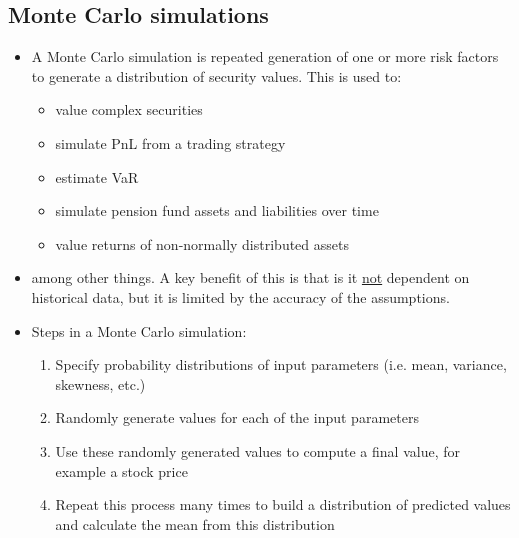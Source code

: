 \documentclass[../notes_compiled.tex]{subfiles}
\begin{document}
\subsection{Monte Carlo simulations}

\begin{itemize}
\item A Monte Carlo simulation is repeated generation of one or more risk factors to generate a distribution of security values. This is used to:
\begin{itemize}
\item value complex securities
\item simulate PnL from a trading strategy
\item estimate VaR
\item simulate pension fund assets and liabilities over time
\item value returns of non-normally distributed assets
\end{itemize}
\item[] among other things. A key benefit of this is that is it \underline{not} dependent on historical data, but it is limited by the accuracy of the assumptions.
\item Steps in a Monte Carlo simulation:
\begin{enumerate}
\item Specify probability distributions of input parameters (i.e. mean, variance, skewness, etc.)
\item Randomly generate values for each of the input parameters
\item Use these randomly generated values to compute a final value, for example a stock price
\item Repeat this process many times to build a distribution of predicted values and calculate the mean from this distribution
\end{enumerate}
\end{itemize}
\end{document}

